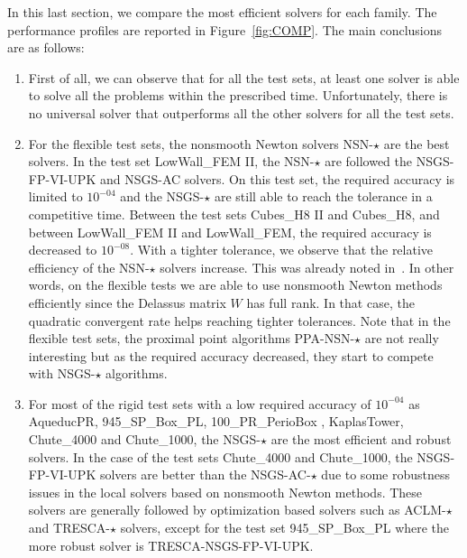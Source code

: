 In this last section, we compare the most efficient solvers for each family. The performance profiles are reported in Figure~\ref{fig:COMP}. The main conclusions are as follows:
\begin{enumerate}
\item First of all, we can observe that for all the test sets, at least one solver is able to solve all the problems within the prescribed time.  Unfortunately, there is no universal solver that outperforms all the other solvers for all the test sets.
\item For the flexible test sets, the nonsmooth Newton solvers {\sf NSN-$\star$} are the best solvers. In the test set LowWall\_FEM II, the {\sf NSN-$\star$} are followed the {\sf NSGS-FP-VI-UPK} and {\sf NSGS-AC} solvers. On this test set, the required accuracy is limited to $10^{-04}$ and the  {\sf NSGS-$\star$} are still able to reach the tolerance in a competitive time. Between the test sets {Cubes\_H8 II} and {Cubes\_H8}, and between LowWall\_FEM II and LowWall\_FEM, the required accuracy is decreased to $10^{-08}$. With a tighter tolerance, we observe that the relative efficiency of the {\sf NSN-$\star$} solvers increase. This was already noted in~\citep{Acary.ea_CSMA2017}. In other words, on the flexible tests we are able to use nonsmooth Newton methods efficiently since the Delassus matrix $W$ has full rank. In that case, the quadratic convergent rate helps reaching tighter tolerances. Note that in the flexible test sets, the proximal point algorithms {\sf PPA-NSN-$\star$} are not really interesting but as the required accuracy decreased, they start to compete with {\sf NSGS-$\star$} algorithms.

\item For most of the rigid test sets with a low required accuracy of $10^{-04}$ as AqueducPR, 945\_SP\_Box\_PL, 100\_PR\_PerioBox , KaplasTower, Chute\_4000 and Chute\_1000,   the {\sf NSGS-$\star$} are the most efficient and robust solvers. In the case of the test sets Chute\_4000 and Chute\_1000,  the {\sf NSGS-FP-VI-UPK} solvers are better than the {\sf NSGS-AC-$\star$} due to some robustness issues in the local solvers based on nonsmooth Newton methods. These solvers are generally followed by optimization based solvers such as {\sf ACLM-$\star$} and {\sf TRESCA-$\star$} solvers, except for the test set 945\_SP\_Box\_PL where the more robust solver is {\sf TRESCA-NSGS-FP-VI-UPK}.
  

\end{enumerate}
